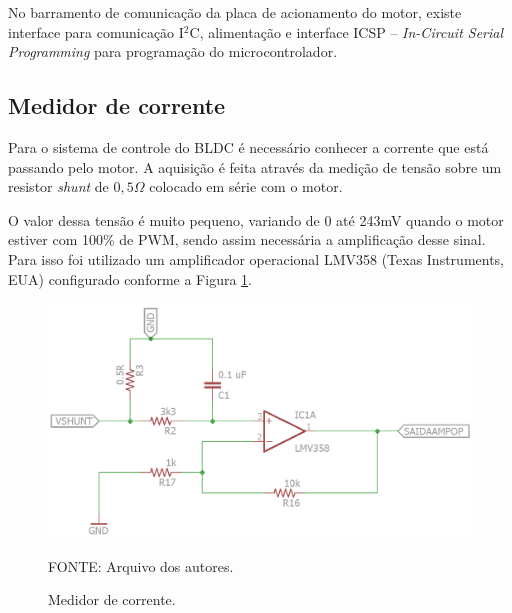 \documentclass[
	12pt,				%
	openany,			%
	twoside,			%
	a4paper,			%
	english,			%
	french,				%
	spanish,			%
	brazil,				%
	oldfontcommands
	]{abntex2}
\begin{document}
	

No barramento de comunicação da placa de acionamento do motor, existe interface para comunicação I$^{2}$C, alimentação e interface ICSP – \textit{In-Circuit Serial Programming} para programação do microcontrolador.

	

\subsection{Medidor de corrente}

Para o sistema de controle do BLDC é necessário conhecer a corrente que está passando pelo motor. A aquisição é feita através da medição de tensão sobre um resistor \textit{shunt} de $0,5\Omega$ colocado  em série com o motor. 

O valor dessa tensão é muito pequeno, variando de 0 até 243mV quando o motor estiver com 100\% de PWM, sendo assim necessária a amplificação desse sinal. Para isso foi utilizado um amplificador operacional LMV358 (Texas Instruments, EUA) configurado conforme a Figura \ref{fig:Medidor_corrente}.

\begin{figure}[th]
	\caption{Medidor de corrente.}
	\centering
	\includegraphics[width=1\linewidth]{./figs/Medidor_corrente_motores}
	
	\begin{small}
		FONTE: Arquivo dos autores.
	\end{small}
	\label{fig:Medidor_corrente}
\end{figure}
\end{document}
